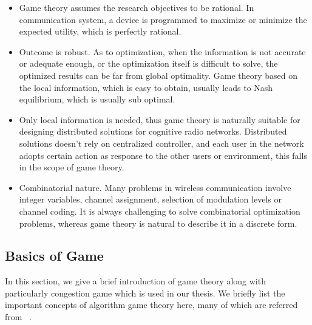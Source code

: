 \begin{itemize}
\item Game theory assumes the research objectives to be rational.
In communication system, a device is programmed to maximize or minimize the expected utility, which is perfectly rational.

\item Outcome is robust\cite{Han:2008:RAW:1457343}.
As to optimization, when the information is not accurate or adequate enough, or the optimization itself is difficult to solve, the optimized results can be far from global optimality.
Game theory based on the local information, which is easy to obtain, usually leads to Nash equilibrium, which is usually sub optimal.


\item 
Only local information is needed, thus game theory is naturally suitable for designing distributed solutions for cognitive radio networks.
Distributed solutions doesn't rely on centralized controller, and each user in the network adopts certain action as response to the other users or environment, this falls in the scope of game theory.

\item Combinatorial nature.\cite{Han:2008:RAW:1457343}
Many problems in wireless communication involve integer variables, \ie channel assignment, selection of modulation levels or channel coding.
It is always challenging to solve combinatorial optimization problems, whereas game theory is natural to describe it in a discrete form.




\end{itemize}



 

\subsection{Basics of Game}
In this section, we give a brief introduction of game theory along with particularly congestion game which is used in our thesis.
We briefly list the important concepts of algorithm game theory here, many of which are referred from ~\cite{agt_book}.


